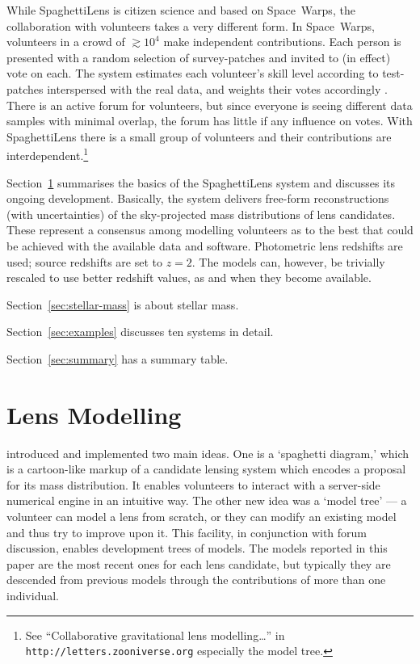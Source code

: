 \documentclass[fleqn,usenatbib]{mnras}
\begin{document}
While SpaghettiLens is citizen science and based on Space~Warps, the
collaboration with volunteers takes a very different form.  In
Space~Warps, volunteers in a crowd of $\gtrsim10^4$ make independent
contributions.  Each person is presented with a random selection of
survey-patches and invited to (in effect) vote on each.  The system
estimates each volunteer's skill level according to test-patches
interspersed with the real data, and weights their votes accordingly
\citep{2016MNRAS.455.1171M}.  There is an active forum for volunteers,
but since everyone is seeing different data samples with minimal
overlap, the forum has little if any influence on votes.  With
SpaghettiLens there is a small group of volunteers and their
contributions are interdependent.\footnote{See ``Collaborative
  gravitational lens modelling\dots'' in {\tt
    http://letters.zooniverse.org} especially the model tree.}

Section~\ref{sec:spl} summarises the basics of the SpaghettiLens
system and discusses its ongoing development.  Basically, the system
delivers free-form reconstructions (with uncertainties) of the
sky-projected mass distributions of lens candidates.  These represent
a consensus among modelling volunteers as to the best that could be
achieved with the available data and software.  Photometric lens
redshifts are used; source redshifts are set to $z=2$.  The models
can, however, be trivially rescaled to use better redshift values, as
and when they become available.

Section~\ref{sec:stellar-mass} is about stellar mass.

Section~\ref{sec:examples} discusses ten systems in detail.

Section~\ref{sec:summary} has a summary table.


\section{Lens Modelling}\label{sec:spl}

\cite{2015MNRAS.447.2170K} introduced and implemented two
main ideas. One is a `spaghetti diagram,' which is a cartoon-like
markup of a candidate lensing system which encodes a proposal for its
mass distribution.  It enables volunteers to interact with a
server-side numerical engine \citep[GLASS, developed
  by][]{2014MNRAS.445.2181C} in an intuitive way.  The other new idea
was a `model tree' --- a volunteer can model a lens from scratch, or
they can modify an existing model and thus try to improve upon it.
This facility, in conjunction with forum discussion, enables
development trees of models.  The models reported in this paper are
the most recent ones for each lens candidate, but typically they are
descended from previous models through the contributions of more than
one individual.
\end{document}
